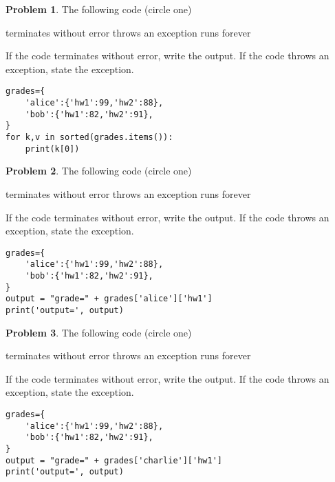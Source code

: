 \documentclass[10pt]{article}
\theoremstyle{definition}
\newtheorem{problem}{Problem}
\begin{document}
\begin{problem}
    The following code (circle one)

    \vspace{0.25in}
    \hspace{0.5in}terminates without error 
    \hspace{1in}throws an exception
    \hspace{1in}runs forever
    \vspace{0.25in}

    \noindent
    If the code terminates without error, write the output.
    If the code throws an exception, state the exception.
\end{problem}
\begin{lstlisting}
grades={
    'alice':{'hw1':99,'hw2':88},
    'bob':{'hw1':82,'hw2':91},
}
for k,v in sorted(grades.items()):
    print(k[0])
\end{lstlisting}
\vspace{0.75in}


\begin{problem}
    The following code (circle one)

    \vspace{0.25in}
    \hspace{0.5in}terminates without error 
    \hspace{1in}throws an exception
    \hspace{1in}runs forever
    \vspace{0.25in}

    \noindent
    If the code terminates without error, write the output.
    If the code throws an exception, state the exception.
\end{problem}
\begin{lstlisting}
grades={
    'alice':{'hw1':99,'hw2':88},
    'bob':{'hw1':82,'hw2':91},
}
output = "grade=" + grades['alice']['hw1']
print('output=', output)
\end{lstlisting}
\vspace{0.75in}


\begin{problem}
    The following code (circle one)

    \vspace{0.25in}
    \hspace{0.5in}terminates without error 
    \hspace{1in}throws an exception
    \hspace{1in}runs forever
    \vspace{0.25in}

    \noindent
    If the code terminates without error, write the output.
    If the code throws an exception, state the exception.
\end{problem}
\begin{lstlisting}
grades={
    'alice':{'hw1':99,'hw2':88},
    'bob':{'hw1':82,'hw2':91},
}
output = "grade=" + grades['charlie']['hw1']
print('output=', output)
\end{lstlisting}
\vspace{0.75in}
\end{document}
